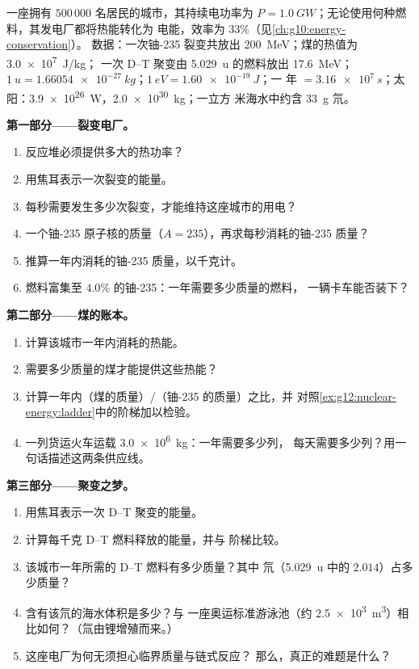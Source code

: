 \begin{problem}
\label{pb:g12:nuclear-energy:1}
一座拥有 $500\,000$ 名居民的城市，其持续电功率为
$P = \qty{1.0}{GW}$；无论使用何种燃料，其发电厂都将热能转化为
电能，效率为 $33\%$（见\cref{ch:g10:energy-conservation}）。
数据：一次铀-235 裂变共放出 \qty{200}{MeV}；煤的热值为 \qty{3.0e7}{J/kg}；
一次 D--T 聚变由 \qty{5.029}{u} 的燃料放出 \qty{17.6}{MeV}；
$\qty{1}{u} = \qty{1.66054e-27}{kg}$；$\qty{1}{eV} = \qty{1.60e-19}{J}$；一
年 $= \qty{3.16e7}{s}$；太阳：\qty{3.9e26}{W}，\qty{2.0e30}{kg}；一立方
米海水中约含 \qty{33}{g} 氘。

\medskip
\noindent\textbf{第一部分——裂变电厂。}
\begin{enumerate}
  \item 反应堆必须提供多大的热功率？
  \item 用焦耳表示一次裂变的能量。
  \item 每秒需要发生多少次裂变，才能维持这座城市的用电？
  \item 一个铀-235 原子核的质量（$A = 235$），再求每秒消耗的铀-235
        质量？
  \item 推算一年内消耗的铀-235 质量，以千克计。
  \item 燃料富集至 $4.0\%$ 的铀-235：一年需要多少质量的燃料，
        一辆卡车能否装下？
\end{enumerate}

\medskip
\noindent\textbf{第二部分——煤的账本。}
\begin{enumerate}[resume]
  \item 计算该城市一年内消耗的热能。
  \item 需要多少质量的煤才能提供这些热能？
  \item 计算一年内（煤的质量）/（铀-235 的质量）之比，并
        对照\cref{ex:g12:nuclear-energy:ladder}中的阶梯加以检验。
  \item 一列货运火车运载 \qty{3.0e6}{kg}：一年需要多少列，
        每天需要多少列？用一句话描述这两条供应线。
\end{enumerate}

\medskip
\noindent\textbf{第三部分——聚变之梦。}
\begin{enumerate}[resume]
  \item 用焦耳表示一次 D--T 聚变的能量。
  \item 计算每千克 D--T 燃料释放的能量，并与
        阶梯比较。
  \item 该城市一年所需的 D--T 燃料有多少质量？其中
        氘（\qty{5.029}{u} 中的 $2.014$）占多少质量？
  \item 含有该氘的海水体积是多少？与
        一座奥运标准游泳池（约 \qty{2.5e3}{m^3}）相比如何？（氚由锂增殖而来。）
  \item 这座电厂为何无须担心临界质量与链式反应？
        那么，真正的难题是什么？
\end{enumerate}


\end{problem}
